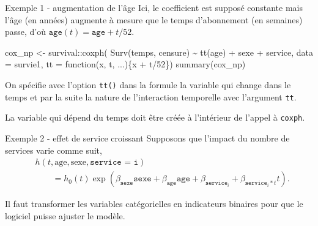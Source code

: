 \documentclass[
  ignorenonframetext,
]{beamer}
\newenvironment{Shaded}{\begin{snugshade}}{\end{snugshade}}
\newcommand{\AttributeTok}[1]{\textcolor[rgb]{0.40,0.45,0.13}{#1}}
\newcommand{\ControlFlowTok}[1]{\textcolor[rgb]{0.00,0.23,0.31}{#1}}
\newcommand{\DecValTok}[1]{\textcolor[rgb]{0.68,0.00,0.00}{#1}}
\newcommand{\FunctionTok}[1]{\textcolor[rgb]{0.28,0.35,0.67}{#1}}
\newcommand{\NormalTok}[1]{\textcolor[rgb]{0.00,0.23,0.31}{#1}}
\newcommand{\OtherTok}[1]{\textcolor[rgb]{0.00,0.23,0.31}{#1}}
\newcommand{\SpecialCharTok}[1]{\textcolor[rgb]{0.37,0.37,0.37}{#1}}
\begin{document}
\begin{frame}[fragile]{Exemple 1 - augmentation de l'âge}
\protect\hypertarget{exemple-1---augmentation-de-luxe2ge}{}
Ici, le coefficient est supposé constante mais l'âge (en années)
augmente à mesure que le temps d'abonnement (en semaines) passe, d'où
\(\texttt{age}(t) = \texttt{age} + t/52\).

\begin{Shaded}
\begin{Highlighting}[numbers=left,,]
\NormalTok{cox\_np }\OtherTok{\textless{}{-}}\NormalTok{ survival}\SpecialCharTok{::}\FunctionTok{coxph}\NormalTok{(}
    \FunctionTok{Surv}\NormalTok{(temps, censure) }\SpecialCharTok{\textasciitilde{}} 
     \FunctionTok{tt}\NormalTok{(age) }\SpecialCharTok{+}\NormalTok{ sexe }\SpecialCharTok{+}\NormalTok{ service, }
     \AttributeTok{data =}\NormalTok{ survie1, }
     \AttributeTok{tt =} \ControlFlowTok{function}\NormalTok{(x, t, ...)\{x }\SpecialCharTok{+}\NormalTok{ t}\SpecialCharTok{/}\DecValTok{52}\NormalTok{\})}
\FunctionTok{summary}\NormalTok{(cox\_np)}
\end{Highlighting}
\end{Shaded}

\footnotesize

On spécifie avec l'option \texttt{tt()} dans la formule la variable qui
change dans le temps et par la suite la nature de l'interaction
temporelle avec l'argument \texttt{tt}.

La variable qui dépend du temps doit être créée à l'intérieur de l'appel
à \texttt{coxph}.
\end{frame}

\begin{frame}{Exemple 2 - effet de service croissant}
\protect\hypertarget{exemple-2---effet-de-service-croissant}{}
Supposons que l'impact du nombre de services varie comme suit,
\begin{align*}
&h(t, \text{age}, \text{sexe}, \texttt{service = i}) \\ &\qquad = h_0(t)\exp(\beta_{\texttt{sexe}}\texttt{sexe} + \beta_{\texttt{age}} \texttt{age} + \beta_{\texttt{service}_i} + \beta_{\texttt{service}_i*t}t).
\end{align*}

Il faut transformer les variables catégorielles en indicateurs binaires
pour que le logiciel puisse ajuster le modèle.
\end{frame}
\end{document}
